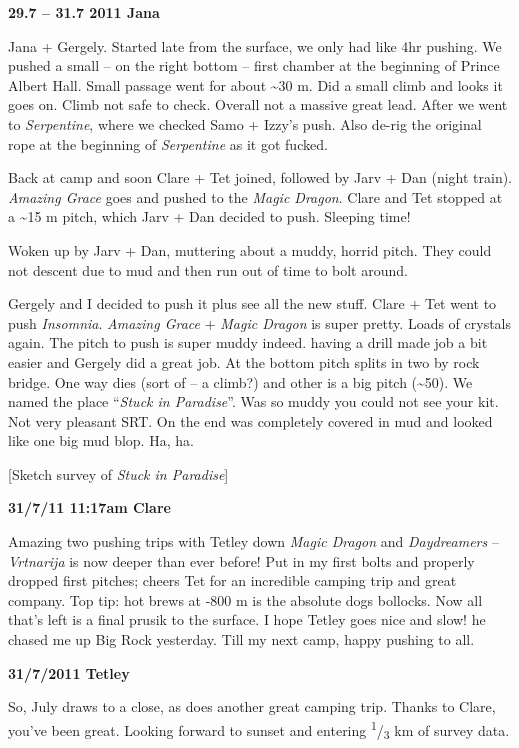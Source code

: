 \textbf{29.7 -- 31.7 2011 Jana}

Jana + Gergely. Started late from the surface, we only had like 4hr
pushing. We pushed a small -- on the right bottom -- first chamber at
the beginning of Prince Albert Hall. Small passage went for about
\textasciitilde 30 m. Did a small climb and looks it goes on. Climb not
safe to check. Overall not a massive great lead. After we went to
\emph{Serpentine}, where we checked Samo + Izzy's push. Also de-rig the
original rope at the beginning of \emph{Serpentine} as it got fucked.

Back at camp and soon Clare + Tet joined, followed by Jarv + Dan (night
train). \emph{Amazing Grace} goes and pushed to the \emph{Magic Dragon}.
Clare and Tet stopped at a \textasciitilde 15 m pitch, which Jarv + Dan
decided to push. Sleeping time!

Woken up by Jarv + Dan, muttering about a muddy, horrid pitch. They
could not descent due to mud and then run out of time to bolt around.

Gergely and I decided to push it plus see all the new stuff. Clare + Tet
went to push \emph{Insomnia}. \emph{Amazing Grace} + \emph{Magic Dragon}
is super pretty. Loads of crystals again. The pitch to push is super
muddy indeed. having a drill made job a bit easier and Gergely did a
great job. At the bottom pitch splits in two by rock bridge. One way
dies (sort of -- a climb?) and other is a big pitch
(\textasciitilde 50). We named the place ``\emph{Stuck in Paradise}''.
Was so muddy you could not see your kit. Not very pleasant SRT. On the
end was completely covered in mud and looked like one big mud blop. Ha,
ha.

{[}Sketch survey of \emph{Stuck in Paradise}{]}

\textbf{31/7/11 11:17am Clare}

Amazing two pushing trips with Tetley down \emph{Magic Dragon} and
\emph{Daydreamers} -- \emph{Vrtnarija} is now deeper than ever before!
Put in my first bolts and properly dropped first pitches; cheers Tet for
an incredible camping trip and great company. Top tip: hot brews at -800
m is the absolute dogs bollocks. Now all that's left is a final prusik
to the surface. I hope Tetley goes nice and slow! he chased me up Big
Rock yesterday. Till my next camp, happy pushing to all.

\textbf{31/7/2011 Tetley}

So, July draws to a close, as does another great camping trip. Thanks to
Clare, you've been great. Looking forward to sunset and entering
\textsuperscript{1}/\textsubscript{3} km of survey data.

